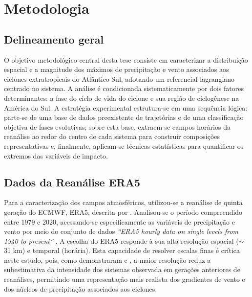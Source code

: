 \chapter{Metodologia}\label{cap:metodologia}

\section{Delineamento geral}\label{sec:diseno_general}

O objetivo metodológico central desta tese consiste em caracterizar a distribuição espacial e a magnitude dos máximos de precipitação e vento associados aos ciclones extratropicais do Atlântico Sul, adotando um referencial lagrangiano centrado no sistema. A análise é condicionada sistematicamente por dois fatores determinantes: a fase do ciclo de vida do ciclone e sua região de ciclogênese na América do Sul. A estratégia experimental estrutura-se em uma sequência lógica: parte-se de uma base de dados preexistente de trajetórias e de uma classificação objetiva de fases evolutivas; sobre esta base, extraem-se campos horários da reanálise ao redor do centro de cada sistema para construir composições representativas e, finalmente, aplicam-se técnicas estatísticas para quantificar os extremos das variáveis de impacto.

\section{Dados da Reanálise ERA5}\label{sec:datos_era5}
Para a caracterização dos campos atmosféricos, utilizou-se a reanálise de quinta geração do ECMWF, ERA5, descrita por \citet{hersbach2020era5}. Analisou-se o período compreendido entre 1979 e 2020, acessando-se especificamente as variáveis de precipitação e vento por meio do conjunto de dados \textit{``ERA5 hourly data on single levels from 1940 to present''} \citep{hersbach_era5_2023b}. A escolha do ERA5 responde à sua alta resolução espacial ($\sim$31 km) e temporal (horária). Esta capacidade de resolver escalas finas é crítica neste estudo, pois, como demonstraram \citet{priestley2022improved} e \citet{dalanhese2023new}, a maior resolução reduz a subestimativa da intensidade dos sistemas observada em gerações anteriores de reanálises, permitindo uma representação mais realista dos gradientes de vento e dos núcleos de precipitação associados aos ciclones.

